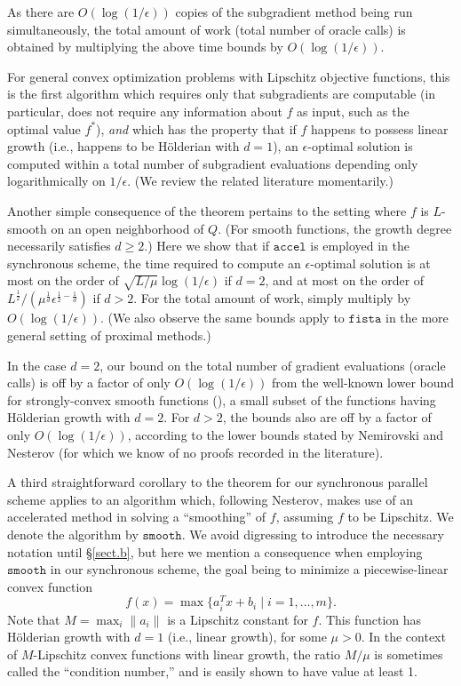 \documentclass[reqno, 11pt]{amsart}
\numberwithin{equation}{section}
\newcommand{\accel}{\mathtt{accel}}
\newcommand{\fista}{\mathtt{fista}}
\newcommand{\smooth}{\mathtt{smooth}}
\begin{document}
 As there are $ O(\log(1/\epsilon)) $  copies of the subgradient method being run simultaneously, the total amount of work (total number of oracle calls) is obtained by multiplying the above time bounds by $ O(\log(1/\epsilon)) $. 
 
For general convex optimization problems with Lipschitz objective functions, this is the first algorithm which requires only that subgradients are computable (in particular, does not require any information about $ f $ as input, such as the optimal value $ f^* $), {\em  and} which has  the property that if  $ f $ happens to possess linear growth (i.e., happens to be H\"{o}lderian with $ d = 1 $), an $ \epsilon $-optimal solution is computed within a total number of subgradient evaluations depending only logarithmically on $ 1/\epsilon  $. (We review the related literature momentarily.)
 
Another simple consequence of the theorem pertains to the setting where $ f $ is $ L $-smooth on an open neighborhood of $ Q $. (For smooth functions, the growth degree necessarily satisfies $ d \geq 2 $.)  Here we show that if $ \accel $  is employed in the synchronous scheme, the time required to compute an $ \epsilon $-optimal solution is at most on the order of $ \sqrt{L/\mu} \log(1/ \epsilon) $ if $ d = 2 $, and at most on the order of $ L^{\frac{1}{2}}/ (\mu^{\frac{1}{d}} \epsilon^{\frac{1}{2} - \frac{1}{d}}) $    if $ d > 2 $. For the total amount of work, simply multiply by $ O(\log(1/\epsilon)) $. (We also observe the same bounds apply to $ \fista $ in the more general setting of proximal methods.)

In the case $ d = 2 $, our bound on the total number of gradient evaluations (oracle calls) is off by a factor of  only $ O(\log(1/ \epsilon )) $ from the well-known lower bound for strongly-convex smooth functions (\cite{nemirovsky1983problem}), a small subset of the functions having H\"{o}lderian growth with $ d = 2 $.  For $ d > 2 $, the bounds also are off by a factor of only $ O(\log(1/ \epsilon )) $, according to the lower bounds stated by Nemirovski and Nesterov \cite[page 26]{NemNes85}  (for which we know of no proofs recorded in the literature).

A third straightforward corollary to the theorem for our synchronous parallel scheme applies to an algorithm which, following Nesterov\cite{nesterov2005smooth}, makes use of an accelerated method in solving a ``smoothing'' of $ f $, assuming $ f $ to be Lipschitz. We denote the algorithm by $ \smooth $. We avoid digressing to introduce the necessary notation until \S\ref{sect.b}, but here we mention a consequence when employing $ \smooth $ in our synchronous scheme, the goal being to minimize a piecewise-linear convex function
\[ 
      f(x) = \max \{ a_i^T x + b_i \mid i = 1, \ldots, m \}.
\]     
Note that $ M = \max_i \| a_i \| $ is a Lipschitz constant for $ f $. This function has H\"{o}lderian growth with $ d = 1 $ (i.e., linear growth), for some $ \mu > 0 $. In the context of $ M $-Lipschitz convex functions with linear growth, the ratio $ M/\mu $ is sometimes called the ``condition number,'' and is easily shown to have value at least 1.
\end{document}
